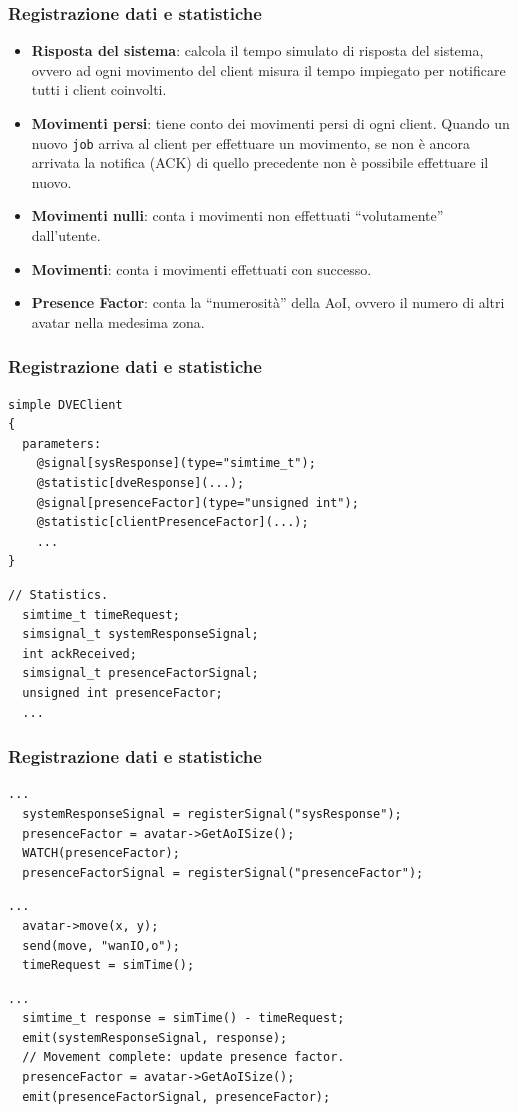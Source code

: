 \begin{frame}
\frametitle{Registrazione dati e statistiche}
\begin{itemize}[<+->]
\item \textbf{Risposta del sistema}: calcola il tempo simulato di risposta
del sistema, ovvero ad ogni movimento del client misura il tempo impiegato
per notificare tutti i client coinvolti.
\item \textbf{Movimenti persi}: tiene conto dei movimenti persi di ogni client.
Quando un nuovo \texttt{job} arriva al client per effettuare un movimento, se
non è ancora arrivata la notifica (ACK) di quello precedente non è possibile
effettuare il nuovo.
\item \textbf{Movimenti nulli}: conta i movimenti non effettuati ``volutamente''
dall'utente.
\item \textbf{Movimenti}: conta i movimenti effettuati con successo.
\item \textbf{Presence Factor}: conta la ``numerosità'' della AoI, ovvero
il numero di altri avatar nella medesima zona.
\end{itemize}
\end{frame}

\begin{frame}[fragile]
\frametitle{Registrazione dati e statistiche}
\begin{lstlisting}[title = {Modulo ned}]
simple DVEClient
{
  parameters:
    @signal[sysResponse](type="simtime_t");
    @statistic[dveResponse](...);
    @signal[presenceFactor](type="unsigned int");
    @statistic[clientPresenceFactor](...);
    ...
}
\end{lstlisting}
\begin{lstlisting}[title = {Classe \texttt{DVEClient}}]
  // Statistics.
  simtime_t timeRequest;
  simsignal_t systemResponseSignal;
  int ackReceived;
  simsignal_t presenceFactorSignal;
  unsigned int presenceFactor;
  ...
\end{lstlisting}
\end{frame}

\begin{frame}[fragile]
\frametitle{Registrazione dati e statistiche}
\begin{lstlisting}[title = {Inizializzazione}]
  ...
  systemResponseSignal = registerSignal("sysResponse");
  presenceFactor = avatar->GetAoISize();
  WATCH(presenceFactor);
  presenceFactorSignal = registerSignal("presenceFactor");
\end{lstlisting}
\begin{lstlisting}[title = {Movimento}]
  ...
  avatar->move(x, y);
  send(move, "wanIO,o");
  timeRequest = simTime();
\end{lstlisting}
\begin{lstlisting}[title = {System Response}]
  ...
  simtime_t response = simTime() - timeRequest;
  emit(systemResponseSignal, response);
  // Movement complete: update presence factor.
  presenceFactor = avatar->GetAoISize();
  emit(presenceFactorSignal, presenceFactor);
\end{lstlisting}
\end{frame}


